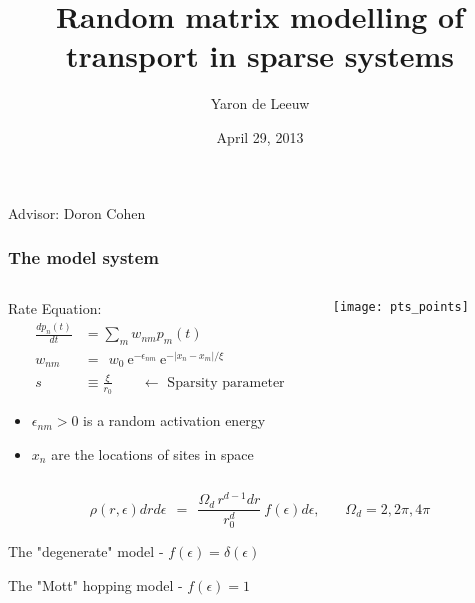 \documentclass{beamer}
\newcommand{\eexp}{\mbox{e}^}
\begin{document}
\title[PhD Proposal]{Random matrix modelling of transport in sparse systems}  
\author{Yaron de Leeuw}
\date{April 29, 2013} 

\begin{frame}
 \titlepage
Advisor: Doron Cohen
\end{frame}



\begin{frame}
\frametitle{The model system}
\begin{columns}
    \begin{column}{0.6\textwidth}
    Rate Equation:
    \begin{align*}
      \frac{dp_n(t)}{dt} &= \sum_m w_{nm} p_m(t)\\
      w_{nm} \ \ &= \ \  w_0 \ \eexp{-\epsilon_{nm}} \ \eexp{-|x_n-x_m|/\xi}\\
      s &\equiv \frac{\xi}{r_0} \qquad \leftarrow \textrm{  Sparsity parameter}
    \end{align*}
    \begin{itemize}
    \item $\epsilon_{nm}>0$ is a random activation energy
    \item $x_n$ are the locations of sites in space
    \end{itemize}
    \end{column}
    \begin{column}{0.4\textwidth}
    \texttt{[image: pts\_points]}
    \end{column}
\end{columns}

\[
\rho(r,\epsilon)drd\epsilon \ \ = \ \ \frac{\Omega_d \, r^{d-1}dr}{r_0^{d}} \ f(\epsilon)d\epsilon,     
\ \ \ \ \ \ \ \ \Omega_d=2,2\pi,4\pi
\]

The "degenerate" model -  $f(\epsilon) = \delta(\epsilon)$

The "Mott" hopping model - $f(\epsilon) = 1$
\end{frame}
\end{document}
